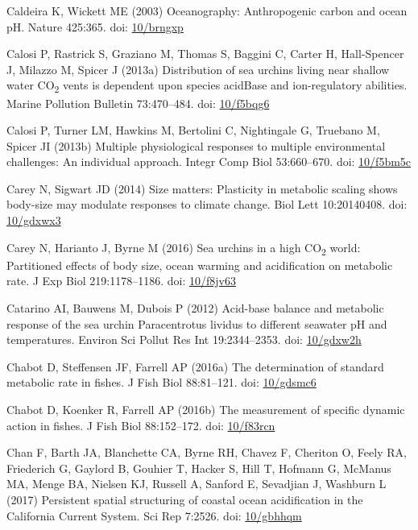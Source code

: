 \documentclass[a4paper,10pt, oneside]{memoir}
\begin{document}
\leavevmode\hypertarget{ref-Caldeira2003}{}%
Caldeira K, Wickett ME (2003) Oceanography: Anthropogenic carbon and ocean pH. Nature 425:365. doi: \href{https://doi.org/10/brngxp}{10/brngxp}

\leavevmode\hypertarget{ref-Calosi2013}{}%
Calosi P, Rastrick S, Graziano M, Thomas S, Baggini C, Carter H, Hall-Spencer J, Milazzo M, Spicer J (2013a) Distribution of sea urchins living near shallow water CO\textsubscript{2} vents is dependent upon species acidBase and ion-regulatory abilities. Marine Pollution Bulletin 73:470--484. doi: \href{https://doi.org/10/f5bqg6}{10/f5bqg6}

\leavevmode\hypertarget{ref-Calosi2013a}{}%
Calosi P, Turner LM, Hawkins M, Bertolini C, Nightingale G, Truebano M, Spicer JI (2013b) Multiple physiological responses to multiple environmental challenges: An individual approach. Integr Comp Biol 53:660--670. doi: \href{https://doi.org/10/f5bm5c}{10/f5bm5c}

\leavevmode\hypertarget{ref-Carey2014a}{}%
Carey N, Sigwart JD (2014) Size matters: Plasticity in metabolic scaling shows body-size may modulate responses to climate change. Biol Lett 10:20140408. doi: \href{https://doi.org/10/gdxwx3}{10/gdxwx3}

\leavevmode\hypertarget{ref-Carey2016}{}%
Carey N, Harianto J, Byrne M (2016) Sea urchins in a high CO\textsubscript{2} world: Partitioned effects of body size, ocean warming and acidification on metabolic rate. J Exp Biol 219:1178--1186. doi: \href{https://doi.org/10/f8jv63}{10/f8jv63}

\leavevmode\hypertarget{ref-Catarino2012}{}%
Catarino AI, Bauwens M, Dubois P (2012) Acid-base balance and metabolic response of the sea urchin Paracentrotus lividus to different seawater pH and temperatures. Environ Sci Pollut Res Int 19:2344--2353. doi: \href{https://doi.org/10/gdxw2h}{10/gdxw2h}

\leavevmode\hypertarget{ref-Chabot2016b}{}%
Chabot D, Steffensen JF, Farrell AP (2016a) The determination of standard metabolic rate in fishes. J Fish Biol 88:81--121. doi: \href{https://doi.org/10/gdsmc6}{10/gdsmc6}

\leavevmode\hypertarget{ref-Chabot2016}{}%
Chabot D, Koenker R, Farrell AP (2016b) The measurement of specific dynamic action in fishes. J Fish Biol 88:152--172. doi: \href{https://doi.org/10/f83rcn}{10/f83rcn}

\leavevmode\hypertarget{ref-Chan2017}{}%
Chan F, Barth JA, Blanchette CA, Byrne RH, Chavez F, Cheriton O, Feely RA, Friederich G, Gaylord B, Gouhier T, Hacker S, Hill T, Hofmann G, McManus MA, Menge BA, Nielsen KJ, Russell A, Sanford E, Sevadjian J, Washburn L (2017) Persistent spatial structuring of coastal ocean acidification in the California Current System. Sci Rep 7:2526. doi: \href{https://doi.org/10/gbhhqm}{10/gbhhqm}
\end{document}
